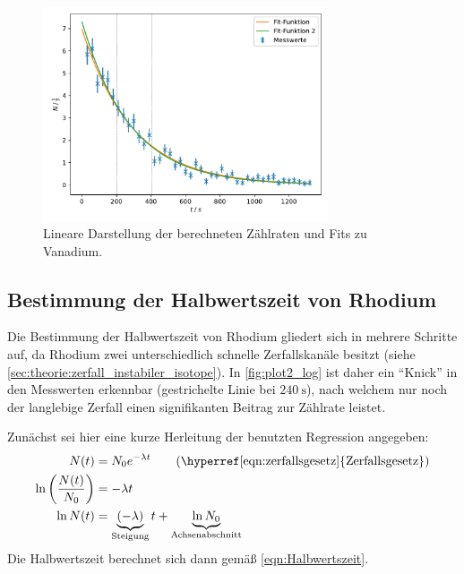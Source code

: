 \begin{figure}
  \centering
  \includegraphics[width=0.75\textwidth]{build/plot1_lin.pdf}
  \caption{Lineare Darstellung der berechneten Zählraten und Fits zu Vanadium.}
  \label{fig:plot1_lin}
\end{figure}


\subsection{Bestimmung der Halbwertszeit von Rhodium}
Die Bestimmung der Halbwertszeit von Rhodium gliedert sich in mehrere Schritte auf,
da Rhodium zwei unterschiedlich schnelle Zerfallskanäle besitzt (siehe \autoref{sec:theorie:zerfall_instabiler_isotope}).
In \autoref{fig:plot2_log} ist daher ein \enquote{Knick} in den Messwerten erkennbar
(gestrichelte Linie bei $\SI{240}{\second}$),
nach welchem nur noch der langlebige Zerfall einen signifikanten Beitrag zur Zählrate leistet.

Zunächst sei hier eine kurze Herleitung der benutzten Regression angegeben:
\begin{align*}
  N(t) &= N_0 e^{-\lambda t}
  \tag{\hyperref[eqn:zerfallsgesetz]{Zerfallsgesetz}} \\
  \ln \left( \frac{N(t)}{N_0} \right) &= - \lambda t \\
  \ln{N(t)} &= \underbrace{(- \lambda)}_\text{Steigung} t + \underbrace{\ln{N_0}}_\text{Achsenabschnitt} \\
\end{align*}
Die Halbwertszeit berechnet sich dann gemäß \autoref{eqn:Halbwertszeit}.

